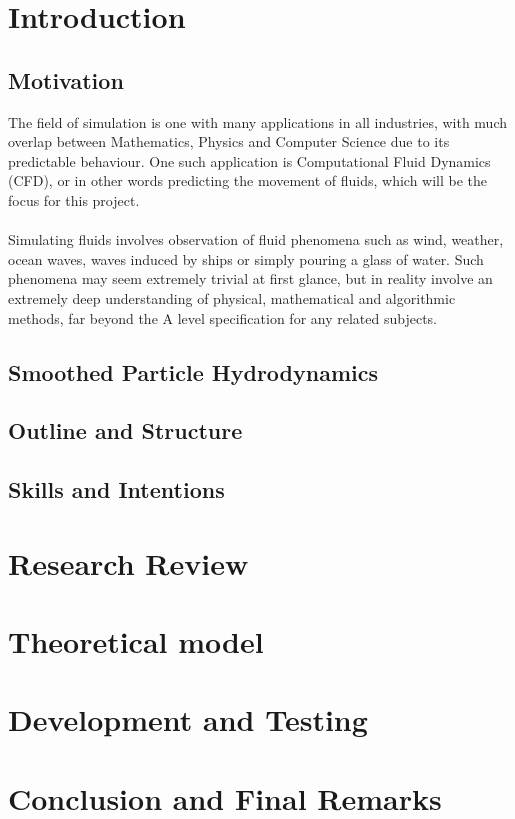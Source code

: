 \documentclass[a4paper,9pt]{article}
\begin{document}
\begin{multicols}{2}
\section{Introduction}
\subsection{Motivation}
The field of simulation is one with many applications in all industries, with much overlap between Mathematics, Physics and Computer Science due to its predictable behaviour. One such application is Computational Fluid Dynamics (CFD), or in other words predicting the movement of fluids, which will be the focus for this project.
\\~\\
\indent Simulating fluids involves observation of fluid phenomena such as wind, weather, ocean waves, waves induced by ships or simply pouring a glass of water. Such phenomena may seem extremely trivial at first glance, but in reality involve an extremely deep understanding of physical, mathematical and algorithmic methods, far beyond the A level specification for any related subjects.
\subsection{Smoothed Particle Hydrodynamics}
\subsection{Outline and Structure}
\subsection{Skills and Intentions}
\section{Research Review}
\section{Theoretical model}
\section{Development and Testing}
\section{Conclusion and Final Remarks}
\end{multicols}

\newpage


\end{document}
